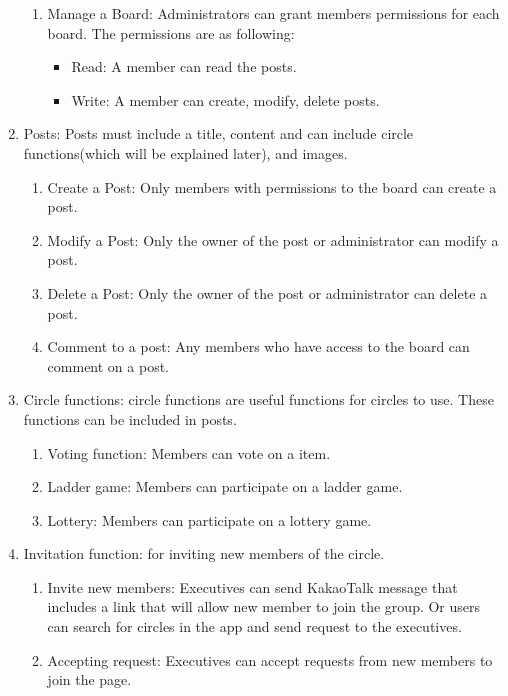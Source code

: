 \documentclass[conference]{IEEEtran}
\begin{document}
\begin{enumerate}
\begin{enumerate}
            \item Manage a Board: Administrators can grant members permissions for each board. The permissions are as following:
                \begin{itemize}
                    \item Read: A member can read the posts.
                    \item Write: A member can create, modify, delete posts.
                \end{itemize}
        \end{enumerate}
    \item Posts: Posts must include a title, content and can include circle functions(which will be explained later), and images. 
        \begin{enumerate}
            \item Create a Post: Only members with permissions to the board can create a post.
            \item Modify a Post: Only the owner of the post or administrator can modify a post.
            \item Delete a Post: Only the owner of the post or administrator can delete a post.
            \item Comment to a post: Any members who have access to the board can comment on a post.
        \end{enumerate}
    \item Circle functions: circle functions are useful functions for circles to use. These functions can be included in posts.
        \begin{enumerate}
            \item Voting function: Members can vote on a item.
            \item Ladder game: Members can participate on a ladder game.
            \item Lottery: Members can participate on a lottery game.
        \end{enumerate}
    \item Invitation function: for inviting new members of the circle.
        \begin{enumerate}
            \item Invite new members: Executives can send KakaoTalk message that includes a link that will allow new member to join the group. Or users can search for circles in the app and send request to the executives. 
            \item Accepting request: Executives can accept requests from new members to join the page.
        \end{enumerate}
\end{enumerate}
\end{document}
